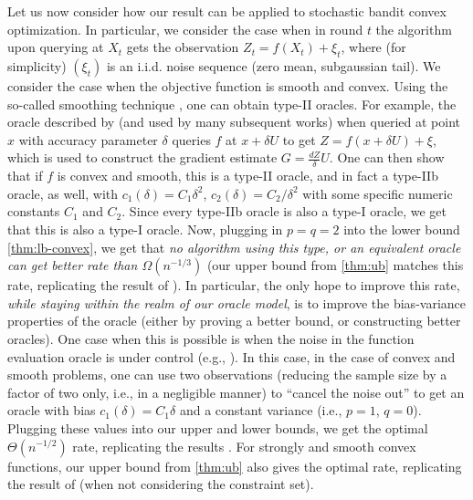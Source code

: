 Let us now consider how our result can be applied to stochastic bandit convex optimization. 
In particular, we consider the case when in round $t$ the algorithm upon querying at $X_t$ gets
the observation $Z_t = f(X_t) + \xi_t$, where (for simplicity) $(\xi_t)$ is an i.i.d. noise sequence (zero mean, subgaussian tail).
We consider the case when the objective function is smooth and convex.
Using the so-called smoothing technique \citep{PoTsy90,flaxman2005online,HaLe14:SOC}, one can obtain
type-II oracles. For example, the oracle described by \citet{flaxman2005online} (and used by many subsequent works)
when queried at point $x$ with accuracy parameter $\delta$ queries $f$ at $x+\delta U$ to get
$Z=f(x+\delta U)+\xi$, which is used to construct the gradient estimate $G = \frac{d Z}{\delta} U$.
One can then show that if $f$ is convex and smooth, this is a type-II oracle, and in fact a type-IIb oracle, as well, with 
$c_1(\delta)=C_1 \delta^2$, $c_2(\delta) = C_2/\delta^2$ with some specific numeric constants $C_1$ and $C_2$.
Since every type-IIb oracle is also a type-I oracle, we get that this is also a type-I oracle.
Now, plugging in $p=q=2$ into the lower bound \cref{thm:lb-convex}, we get that \emph{no algorithm using this type, or an
equivalent oracle can get better rate than $\Omega(n^{-1/3})$} (our upper bound from \cref{thm:ub} matches this rate,
replicating the result of \citet{saha2011improved}).
In particular, the only hope to improve this rate, \emph{while staying within the realm of our oracle model}, is to improve the bias-variance properties of the oracle (either by proving a better bound, or constructing better oracles).
One case when this is possible is when the noise in the function evaluation oracle is under control
(e.g., \citep{Ne11:TR,duchi2015optimal}).
In this case, in the case of convex and smooth problems,
one can use two observations (reducing the sample size by a factor of two only, i.e., in a negligible manner) 
to ``cancel the noise out''  to get an oracle with bias $c_1(\delta) = C_1\delta$ 
and a constant variance (i.e., $p=1$, $q=0$). Plugging these values into our upper and lower bounds, we get the optimal $\Theta(n^{-1/2})$ rate, replicating the results \citet{Ne11:TR,duchi2015optimal}.
For strongly and smooth convex functions, our upper bound from  \cref{thm:ub}  also gives the optimal rate,
replicating the result of \citet{HaLe14:SOC} (when not considering the constraint set).


